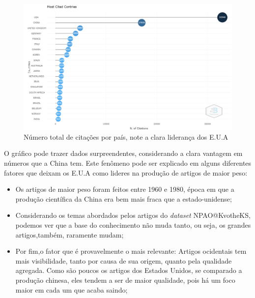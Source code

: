     \begin{figure}[H]
        \centering
        \includegraphics[width=1\textwidth]{experiments/KvotheKS/PesqBibliogr/AlgoritmosSimulacaoOptica-Dinamica/WoS-20220202/Bibliometric/Authors/Most_cited_countries.png}
        \caption{Número total de citações por país, note a clara liderança dos E.U.A}
        \label{fig:KvotheKS:Most_cited_countries}
    \end{figure}
    
    O gráfico pode trazer dados surpreendentes, considerando a clara vantagem em números que a China tem. Este fenômeno pode ser explicado em alguns diferentes fatores que deixam os E.U.A como lideres na produção de artigos de maior peso:
    
    \begin{itemize}
        \item Os artigos de maior peso foram feitos entre 1960 e 1980, época em que a produção científica da China era bem mais fraca que a estado-unidense;
        \item Considerando os temas abordados pelos artigos do \emph{dataset} NPAO@KvotheKS, podemos ver que a base do conhecimento não muda tanto, ou seja, os grandes artigos,também, raramente mudam;
        \item Por fim,o fator que é provavelmente o mais relevante: Artigos ocidentais tem mais visibilidade, tanto por causa de sua origem, quanto pela qualidade agregada. Como são poucos os artigos dos Estados Unidos, se comparado a produção chinesa, eles tendem a ser de maior qualidade, pois há um foco maior em cada um que acaba saindo;
    \end{itemize}
    